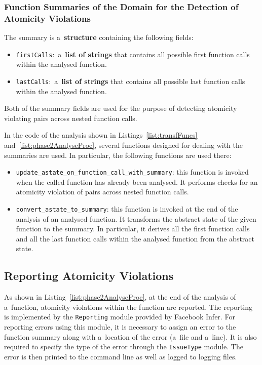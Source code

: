 \subsubsection{%
    Function Summaries of the Domain for the Detection of Atomicity Violations
}

The summary is a~\textbf{structure} containing the following fields:
\begin{itemize}
    \item
        \texttt{firstCalls}:~a~\textbf{list of strings} that contains
        all possible first function calls within the analysed function.

    \item
        \texttt{lastCalls}:~a~\textbf{list of strings} that contains
        all possible last function calls within the analysed function.
\end{itemize}
Both of the summary fields are used for the purpose of detecting atomicity
violating pairs across nested function calls.

In the code of the analysis shown in Listings~\ref{list:transfFuncs}
and~\ref{list:phase2AnalyseProc}, several functions designed for dealing
with the summaries are used. In particular, the following functions are
used there:
\begin{itemize}
    \item
        \texttt{update\_astate\_on\_function\_call\_with\_summary}: this
        function is invoked when the called function has already been
        analysed. It performs checks for an atomicity violation of pairs
        across nested function calls.

    \item
        \texttt{convert\_astate\_to\_summary}: this function is invoked at
        the end of the analysis of an analysed function. It transforms the
        abstract state of the given function to the summary. In particular,
        it derives all the first function calls and all the last function
        calls within the analysed function from the abstract state.
\end{itemize}


\subsection{Reporting Atomicity Violations}
\label{sec:implementPhase2Report}

As shown in Listing~\ref{list:phase2AnalyseProc}, at the
end of the analysis of a~function, atomicity violations within
the function are reported. The reporting is implemented by the
\texttt{Reporting} module provided by Facebook Infer. For reporting
errors using this module, it is necessary to assign an error to the
function summary along with a~location of the error (a~file and a~line).
It is also required to specify the type of the error through the
\texttt{IssueType} module. The error is then printed to the command line
as well as logged to logging files.

